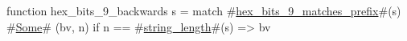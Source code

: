 function hex_bits_9_backwards s =
  match #\hyperref[sailRISCVzhexzybitszy9zymatcheszyprefix]{hex\_bits\_9\_matches\_prefix}#(s) {
      #\hyperref[sailRISCVzSome]{Some}# (bv, n) if n == #\hyperref[sailRISCVzstringzylength]{string\_length}#(s) => bv
  }
